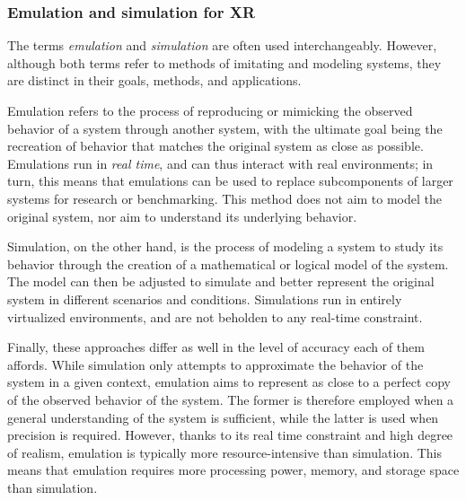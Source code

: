 
\subsubsection{Emulation and simulation for \acs{XR}}


The terms \emph{emulation} and \emph{simulation} are often used interchangeably.
However, although both terms refer to methods of imitating and modeling systems, they are distinct in their goals, methods, and applications.

Emulation refers to the process of reproducing or mimicking the observed behavior of a system through another system, 
with the ultimate goal being the recreation of behavior that matches the original system as close as possible.
Emulations run in \emph{real time}, and can thus interact with real environments;
in turn, this means that emulations can be used to replace subcomponents of larger systems for research or benchmarking.
This method does not aim to model the original system, nor aim to understand its underlying behavior.

Simulation, on the other hand, is the process of modeling a system to study its behavior through the creation of a mathematical or logical model of the system.
The model can then be adjusted to simulate and better represent the original system in different scenarios and conditions.
Simulations run in entirely virtualized environments, and are not beholden to any real-time constraint.

Finally, these approaches differ as well in the level of accuracy each of them affords.
While simulation only attempts to approximate the behavior of the system in a given context, emulation aims to represent as close to a perfect copy of the observed behavior of the system.
The former is therefore employed when a general understanding of the system is sufficient, while the latter is used when precision is required.
However, thanks to its real time constraint and high degree of realism, emulation is typically more resource-intensive than simulation.
This means that emulation requires more processing power, memory, and storage space than simulation.

